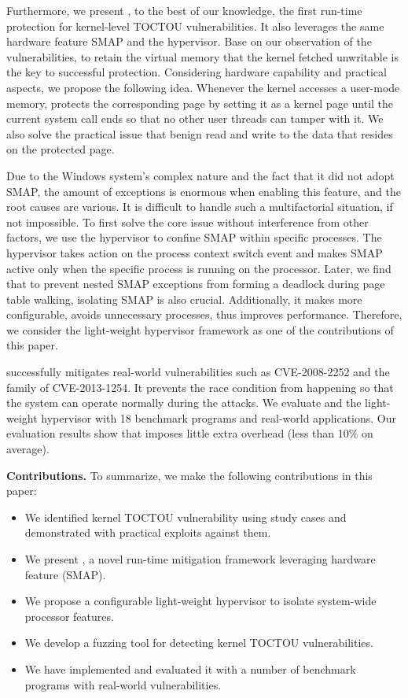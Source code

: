 Furthermore, we present \name, to the best of our knowledge, the first run-time protection for kernel-level TOCTOU vulnerabilities. It also leverages the same hardware feature SMAP and the hypervisor. Base on our observation of the vulnerabilities, to retain the virtual memory that the kernel fetched unwritable is the key to successful protection. Considering hardware capability and practical aspects, we propose the following idea. Whenever the kernel accesses a user-mode memory, \name protects the corresponding page by setting it as a kernel page until the current system call ends so that no other user threads can tamper with it. We also solve the practical issue that benign read and write to the data that resides on the protected page.


Due to the Windows system's complex nature and the fact that it did not adopt SMAP, the amount of exceptions is enormous when enabling this feature, and the root causes are various. It is difficult to handle such a multifactorial situation, if not impossible. To first solve the core issue without interference from other factors, we use the hypervisor to confine SMAP within specific processes. The hypervisor takes action on the process context switch event and makes SMAP active only when the specific process is running on the processor. Later, we find that to prevent nested SMAP exceptions from forming a deadlock during page table walking, isolating SMAP is also crucial. Additionally, it makes \name more configurable, avoids unnecessary processes, thus improves performance. Therefore, we consider the light-weight hypervisor framework as one of the contributions of this paper.

\name successfully mitigates real-world vulnerabilities such as CVE-2008-2252 and the family of CVE-2013-1254. It prevents the race condition from happening so that the system can operate normally during the attacks. We evaluate \name and the light-weight hypervisor with 18 benchmark programs and real-world applications. Our evaluation results show that \name imposes little extra overhead (less than 10\% on average).

\textbf{Contributions.} To summarize, we make the following contributions in this paper:
\begin{itemize}[leftmargin=*]
    \item We identified kernel TOCTOU vulnerability using study cases and demonstrated with practical exploits against them. 
    \item We present \name, a novel run-time mitigation framework leveraging hardware feature (SMAP). 
    \item We propose a configurable light-weight hypervisor to isolate system-wide processor features.
    \item We develop a fuzzing tool \toolname for detecting kernel TOCTOU vulnerabilities.
    \item We have implemented \name and evaluated it with a number of benchmark programs with real-world vulnerabilities.
  
\end{itemize}

